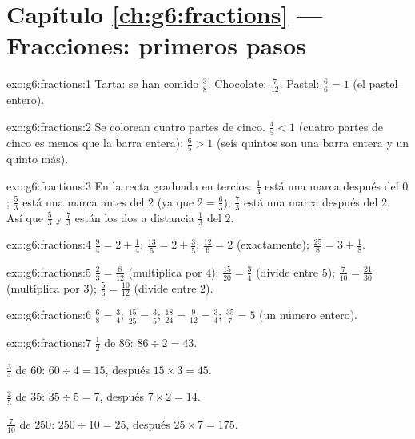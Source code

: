 \section*{Capítulo \ref{ch:g6:fractions} --- Fracciones: primeros pasos}

\begin{solution}{exo:g6:fractions:1}
Tarta: se han comido $\frac38$. \quad Chocolate: $\frac{7}{12}$. \quad
Pastel: $\frac66 = 1$ (el pastel entero).
\end{solution}

\begin{solution}{exo:g6:fractions:2}
Se colorean cuatro partes de cinco. $\frac45 < 1$ (cuatro partes de
cinco es menos que la barra entera); $\frac65 > 1$ (seis quintos son una
barra entera y un quinto más).
\end{solution}

\begin{solution}{exo:g6:fractions:3}
En la recta graduada en tercios: $\frac13$ está una marca después del $0$;
$\frac53$ está una marca antes del $2$ (ya que $2 = \frac63$); $\frac73$ está
una marca después del $2$. Así que $\frac53$ y $\frac73$ están los dos a distancia
$\frac13$ del $2$.
\end{solution}

\begin{solution}{exo:g6:fractions:4}
$\frac94 = 2 + \frac14$; \quad
$\frac{13}{5} = 2 + \frac35$; \quad
$\frac{12}{6} = 2$ (exactamente); \quad
$\frac{25}{8} = 3 + \frac18$.
\end{solution}

\begin{solution}{exo:g6:fractions:5}
$\frac23 = \frac{8}{12}$ (multiplica por $4$); \quad
$\frac{15}{20} = \frac34$ (divide entre $5$); \quad
$\frac{7}{10} = \frac{21}{30}$ (multiplica por $3$); \quad
$\frac56 = \frac{10}{12}$ (divide entre $2$).
\end{solution}

\begin{solution}{exo:g6:fractions:6}
$\frac68 = \frac34$; \quad
$\frac{15}{25} = \frac35$; \quad
$\frac{18}{24} = \frac{9}{12} = \frac34$; \quad
$\frac{35}{7} = 5$ (un número entero).
\end{solution}

\begin{solution}{exo:g6:fractions:7}
$\frac12$ de $86$: $86 \div 2 = 43$.

$\frac34$ de $60$: $60 \div 4 = 15$, después $15 \times 3 = 45$.

$\frac25$ de $35$: $35 \div 5 = 7$, después $7 \times 2 = 14$.

$\frac{7}{10}$ de $250$: $250 \div 10 = 25$, después $25 \times 7 = 175$.
\end{solution}

